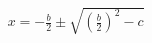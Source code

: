 \documentclass[preview]{standalone}
\begin{document}
\begin{align*}
x = -\frac{b}{2} \pm\sqrt{(\frac{b}{2})^2 - c}
\end{align*}
\end{document}

